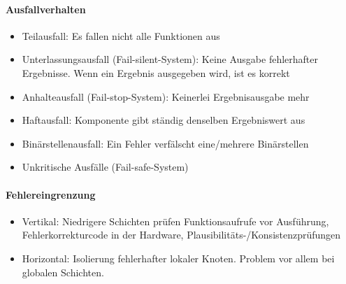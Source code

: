 	\paragraph{Ausfallverhalten}
		\begin{itemize}
			\item Teilausfall: Es fallen nicht alle Funktionen aus
			\item Unterlassungsausfall (Fail-silent-System): Keine Ausgabe fehlerhafter Ergebnisse. Wenn ein Ergebnis ausgegeben wird, ist es korrekt
			\item Anhalteausfall (Fail-stop-System): Keinerlei Ergebnisausgabe mehr
			\item Haftausfall: Komponente gibt ständig denselben Ergebniswert aus
			\item Binärstellenausfall: Ein Fehler verfälscht eine/mehrere Binärstellen
			\item Unkritische Ausfälle (Fail-safe-System)
		\end{itemize}

	\paragraph{Fehlereingrenzung}
		\begin{itemize}
				\item Vertikal: Niedrigere Schichten prüfen Funktionsaufrufe vor Ausführung, Fehlerkorrekturcode in der Hardware, Plausibilitäts-/Konsistenzprüfungen
				\item Horizontal: Isolierung fehlerhafter lokaler Knoten. Problem vor allem bei globalen Schichten.		 
		\end{itemize}
		
